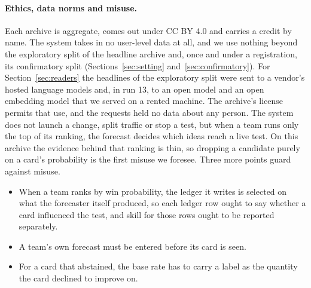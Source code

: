 \paragraph{Ethics, data norms and misuse.} Each archive is aggregate, comes out under CC BY 4.0 and carries a credit by name. The system takes in no user-level data at all, and we use nothing beyond the exploratory split of the headline archive and, once and under a registration, its confirmatory split (Sections~\ref{sec:setting} and~\ref{sec:confirmatory}). For Section~\ref{sec:readers} the headlines of the exploratory split were sent to a vendor's hosted language models and, in run 13, to an open model and an open embedding model that we served on a rented machine. The archive's license permits that use, and the requests held no data about any person. The system does not launch a change, split traffic or stop a test, but when a team runs only the top of its ranking, the forecast decides which ideas reach a live test. On this archive the evidence behind that ranking is thin, so dropping a candidate purely on a card's probability is the first misuse we foresee. Three more points guard against misuse.
\begin{itemize}
\item When a team ranks by win probability, the ledger it writes is selected on what the forecaster itself produced, so each ledger row ought to say whether a card influenced the test, and skill for those rows ought to be reported separately.
\item A team's own forecast must be entered before its card is seen.
\item For a card that abstained, the base rate has to carry a label as the quantity the card declined to improve on.
\end{itemize}
